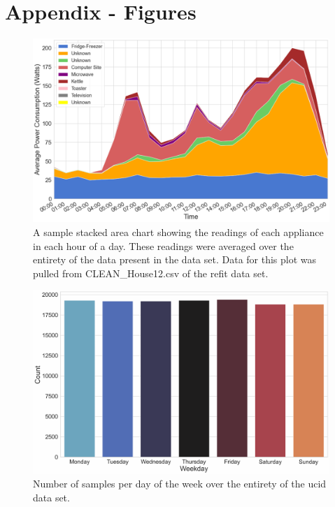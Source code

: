 \appendix

\chapter{Appendix - Figures}
\label{ch:Appendix:Figures}

\begin{figure}[hbt!]
    \centering
    \includegraphics[width=\textwidth]{Images/Chapter 4/REFIT/REFIT-House-12-Stack-Plot.pdf}
    \caption{A sample stacked area chart showing the readings of each appliance in each hour of a day. These readings were averaged over the entirety of the data present in the data set. Data for this plot was pulled from CLEAN\_House12.csv of the \gls{refit} data set.}
    \label{fig:REFIT-House-12-Stack-Plot}
\end{figure}

\begin{figure}[hbt!]
    \centering
    \includegraphics[width=\textwidth]{Images/Chapter 4//UCID/UCID-Day-of-the-Week-Count.pdf}
    \caption{Number of samples per day of the week over the entirety of the \gls{ucid} data set.}
    \label{fig:UCID-Day-of-the-Week-Count}
\end{figure}


